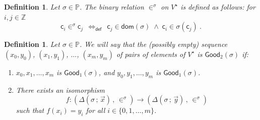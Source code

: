 \documentclass[10pt,a4paper, openany,  oldfontcommands]{memoir}
\newtheorem{definition} [theorem] {Definition}
\newtheorem{open problem} [theorem] {Open Problem}
\begin{document}
 

 
 

 
 
 
 
 
 
 
 



 

 \begin{definition}
Let     $  \sigma    \in   \mathbb{P} $. 
The  binary  relation  $  \in^{   \sigma  }  $  on  $   V^{  \star }   $   is defined  as follows:  for  $  i ,  j  \in  \mathbb{Z} $ 
 \[
    \mathsf{c}_i   \in^{  \sigma  }   \mathsf{c}_j  
    \     \     \Leftrightarrow_{ \mathsf{def}  }     \     \  
   \mathsf{c}_j   \in   \mathsf{dom} \left(   \sigma   \right)   \;  \wedge   \;    \mathsf{c}_i   \in      \sigma  \left(  \mathsf{c}_j   \right)        
     \       .
     \]
 \end{definition} 
 













\begin{definition}
Let     $   \sigma    \in   \mathbb{P} $. 
We  will  say that  the (possibly empty)  sequence   $  \left( x_0, y_0  \right)   $,   $\left( x_1, y_1  \right) $,     $  \ldots    $,    $\left( x_m, y_m  \right) $  of pairs of elements of $  V^{  \star }   $    is   $ \mathsf{Good}_2  \left(   \sigma    \right)   $ if: 
\begin{enumerate}
\item  $ x_0, x_1 ,  \ldots , x_m $  is   $ \mathsf{Good}_1  \left(   \sigma    \right)   $, 
and   $ y_0, y_1 ,  \ldots , y_m $  is   $ \mathsf{Good}_1  \left(   \sigma    \right)   $.





\item  There exists an isomorphism    
     \[
f :       \left(  \Delta  \left(  \sigma  \,  ;  \,     \vec{x}  \right)    \,  ,   \,  \in^{   \sigma   }    \right)       \to   
      \left(   \Delta      \left(   \sigma     \,  ;  \,    \vec{y}     \right)   \,  ,   \,  \in^{   \sigma   }    \right)  
      \]
  such that        $  f (  x_i ) =  y_i  $ for  all   $ i  \in  \lbrace 0, 1,  \ldots , m  \rbrace $. 
\end{enumerate}
\end{definition}
\end{document}
